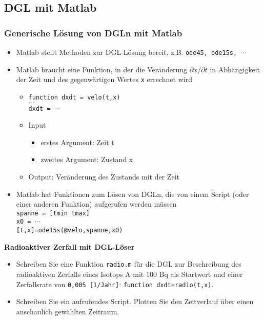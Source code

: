 \subsection{DGL mit Matlab}
  \begin{frame}
      \frametitle{Generische Lösung von DGLn mit Matlab}
      \begin{itemize}
		\item Matlab stellt Methoden zur DGL-Lösung bereit, z.B. \texttt{ode45, ode15s, $\cdots$}        
        \item Matlab braucht eine Funktion, in der die Veränderung \texttt{$\partial{x}/\partial{t}$} in Abhängigkeit der Zeit und des gegenwärtigen Wertes \texttt{x} errechnet wird
         \begin{itemize}
         	\item \texttt{function dxdt = velo(t,x)}\\
         	 $\cdots$ \\
         	 \texttt{dxdt = $\cdots$} \\
         	\item Input
         	  \begin{itemize}
         	    \item erstes Argument: Zeit t
         	    \item zweites Argument: Zustand x
         	  \end{itemize}
         	\item Output: Veränderung des Zustands mit der Zeit 
		 \end{itemize}         	   
        \item Matlab hat Funktionen zum Lösen von DGLn, die von einem Script (oder einer anderen Funktion) aufgerufen werden müssen \\
          \texttt{spanne = [tmin tmax]} \\
          \texttt{x0 = $\cdots$} \\
          \texttt{[t,x]=ode15s(@velo,spanne,x0)} \\
      \end{itemize}
  \end{frame}


  \secMexercise
    \begin{frame}
        \frameMexercise
        \begin{exercise}
            \sloppy
            \textbf{Radioaktiver Zerfall mit DGL-Löser}
            \begin{itemize}
              \item Schreiben Sie eine Funktion \texttt{radio.m} für die DGL zur Beschreibung des radioaktiven Zerfalls eines Isotops A mit 100 Bq als Startwert und einer Zerfallsrate von \texttt{0,005  [1/Jahr]}: \texttt{function dxdt=radio(t,x)}.
              \item Schreiben Sie ein aufrufendes Script. Plotten Sie den Zeitverlauf über einen anschaulich gewählten Zeitraum.
            \end{itemize}
        \end{exercise}
    \end{frame}


